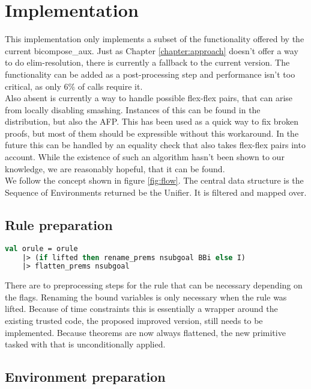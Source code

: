 \chapter{Implementation}\label{chapter:implementation}

This implementation only implements a subset of the functionality offered by the current bicompose\_aux. Just as Chapter \ref{chapter:approach} doesn't offer a way to do elim-resolution, there is currently a fallback to the current version. The functionality can be added as a post-processing step and performance isn't too critical, as only 6\% of calls require it.\\
Also absent is currently a way to handle possible flex-flex pairs, that can arise from locally disabling smashing. Instances of this can be found in the distribution, but also the AFP. This has been used as a quick way to fix broken proofs, but most of them should be expressible without this workaround. In the future this can be handled by an equality check that also takes flex-flex pairs into account. While the existence of such an algorithm hasn't been shown to our knowledge, we are reasonably hopeful, that it can be found.\\
We follow the concept shown in figure \ref{fig:flow}. The central data structure is the Sequence of Environments returned be the Unifier. It is filtered and mapped over. 


\section{Rule preparation}

\begin{lstlisting}[language=ML,breaklines=true]
 val orule = orule
    |> (if lifted then rename_prems nsubgoal BBi else I)
    |> flatten_prems nsubgoal
\end{lstlisting}

There are to preprocessing steps for the rule that can be necessary depending on the flags. Renaming the bound variables is only necessary when the rule was lifted. Because of time constraints this is essentially a wrapper around the existing trusted code, the proposed improved version, still needs to be implemented. Because theorems are now always flattened, the new primitive tasked with that is unconditionally applied.

\section{Environment preparation}

